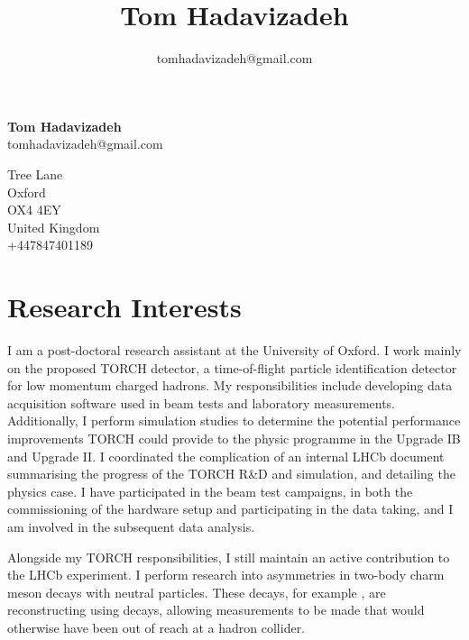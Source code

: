 \documentclass[11pt,a4paper]{article}
\title{\bfseries\Huge Tom Hadavizadeh}
\author{tomhadavizadeh@gmail.com}
\begin{document}
\begin{minipage}[ht]{0.70\textwidth}
{\bfseries\Huge Tom Hadavizadeh}\\[10pt]
{\Large tomhadavizadeh@gmail.com}\\


\end{minipage}
\begin{minipage}[ht]{0.30\textwidth}
{ Tree Lane\\
Oxford\\
OX4 4EY\\
United Kingdom\\
+447847401189\\}
\end{minipage}


\section*{Research Interests}
I am a post-doctoral research assistant at the University of Oxford. I work mainly on the proposed TORCH detector, a time-of-flight particle identification detector for low momentum charged hadrons. My responsibilities include developing data acquisition software used in beam tests and laboratory measurements. Additionally, I perform simulation studies to determine the potential performance improvements TORCH could provide to the \lhcb physic programme in the Upgrade IB and Upgrade II. I coordinated the complication of an internal LHCb document summarising the progress of the TORCH R\&D and simulation, and detailing the physics case.
 I have participated in the beam test campaigns, in both the commissioning of the hardware setup and participating in the data taking, and I am involved in the subsequent data analysis.

 Alongside my TORCH responsibilities, I still maintain an active contribution to the LHCb experiment. I perform research into \CP asymmetries in two-body charm meson decays with neutral particles. These decays, for example \decay{\Dp}{\pip\piz}, are reconstructing using \decay{\piz}{\ep\en\gamma} decays, allowing measurements to be made that would otherwise have been out of reach at a hadron collider.      


\end{document}
